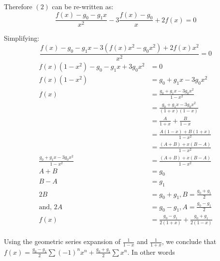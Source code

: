 \documentclass{article}
\begin{document}
{    Therefore $(2)$ can be re-written as:
    \begin{equation}
        \frac{f(x) - g_0 - g_1x}{x^2}
        - 3\frac{f(x) - g_0}{x}
        + 2f(x) = 0
    \end{equation}

    Simplifying:
    \begin{equation}
        \frac{
            f(x) - g_0 - g_1x
            - 3(f(x)x^2 - g_0x^2)
            + 2f(x)x^2
        }{x^2}
        = 0
    \end{equation}
    \begin{align*}
        f(x)(1-x^2)
        - g_0 - g_1x
        + 3g_0x^2
        & = 0\\
        f(x)(1-x^2)
        & =
        g_0 + g_1x
        - 3g_0x^2\\
        f(x)
        & =
        \frac{g_0 + g_1x - 3g_0x^2}{1-x^2}\\
        & = \frac{g_0 + g_1x - 3g_0x^2}{(1+x)(1-x)}\\
        & = \frac{A}{1+x} + \frac{B}{1-x}\\
        & = \frac{A(1-x)+B(1+x)}{1-x^2}\\
        & = \frac{(A+B) + x(B-A)}{1-x^2}\\
        \frac{g_0 + g_1x - 3g_0x^2}{1-x^2}
        & = \frac{(A+B) + x(B-A)}{1-x^2}\\
        A+B & = g_0\\
        B-A & = g_1\\
        2B & = g_0 + g_1, B = \frac{g_0+g_1}{2}\\
        \text{and, } 2A & = g_0 - g_1, A = \frac{g_0-g_1}{2}\\
        f(x) & = \frac{g_0-g_1}{2(1+x)} + \frac{g_0+g_1}{2(1-x)}\\
    \end{align*}

    Using the geometric series expansion of $\frac{1}{1-x}$
    and $\frac{1}{1+x}$, we conclude that
    $
        f(x) = \frac{g_0-g_1}{2} \sum{(-1)^nx^n}
        + \frac{g_0+g_1}{2} \sum{x^n}
    $. In other words\\
    
}
\end{document}
